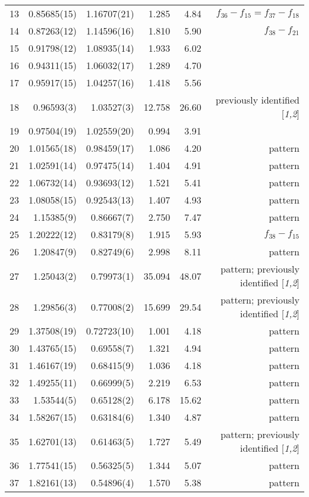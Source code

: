 \documentclass{aa}
\begin{document}
\begin{table*}
\begin{center}
\begin{tabular}{rrrrrr}
13	&	0.85685(15)	&	1.16707(21)	&	1.285	&	4.84	&	$f_{36}-f_{15} = f_{37}-f_{18}$	\\
14	&	0.87263(12)	&	1.14596(16)	&	1.810	&	5.90	&	$f_{38}-f_{21}$	\\
15	&	0.91798(12)	&	1.08935(14)	&	1.933	&	6.02	&		\\
16	&	0.94311(15)	&	1.06032(17)	&	1.289	&	4.70	&		\\
17	&	0.95917(15)	&	1.04257(16)	&	1.418	&	5.56	&		\\
18	&	0.96593(3)	&	1.03527(3)	&	12.758	&	26.60	&	previously identified [{\it 1,2}]	\\
19	&	0.97504(19)	&	1.02559(20)	&	0.994	&	3.91	&		\\
20	&	1.01565(18)	&	0.98459(17)	&	1.086	&	4.20	&	pattern	\\
21	&	1.02591(14)	&	0.97475(14)	&	1.404	&	4.91	&	pattern	\\
22	&	1.06732(14)	&	0.93693(12)	&	1.521	&	5.41	&	pattern	\\
23	&	1.08058(15)	&	0.92543(13)	&	1.407	&	4.93	&	pattern	\\
24	&	1.15385(9)	&	0.86667(7)	&	2.750	&	7.47	&	pattern	\\
25	&	1.20222(12)	&	0.83179(8)	&	1.915	&	5.93	&	$f_{38}-f_{15}$	\\
26	&	1.20847(9)	&	0.82749(6)	&	2.998	&	8.11	&	pattern	\\
27	&	1.25043(2)	&	0.79973(1)	&	35.094	&	48.07	&	pattern; previously identified [{\it 1,2}]  \\
28	&	1.29856(3)	&	0.77008(2)	&	15.699	&	29.54	&	pattern; previously identified [{\it 1,2}]	\\
29	&	1.37508(19)	&	0.72723(10)	&	1.001	&	4.18	&	pattern	\\
30	&	1.43765(15)	&	0.69558(7)	&	1.321	&	4.94	&	pattern	\\
31	&	1.46167(19)	&	0.68415(9)	&	1.036	&	4.18	&	pattern	\\
32	&	1.49255(11)	&	0.66999(5)	&	2.219	&	6.53	&	pattern	\\
33	&	1.53544(5)	&	0.65128(2)	&	6.178	&	15.62	&	pattern	\\
34	&	1.58267(15)	&	0.63184(6)	&	1.340	&	4.87	&	pattern	\\
35	&	1.62701(13)	&	0.61463(5)	&	1.727	&	5.49	&	pattern; previously identified [{\it 1,2}]	\\
36	&	1.77541(15)	&	0.56325(5)	&	1.344	&	5.07	&	pattern	\\
37	&	1.82161(13)	&	0.54896(4)	&	1.570	&	5.38	&	pattern	\\

\end{tabular}
\end{center}
\end{table*}
\end{document}
